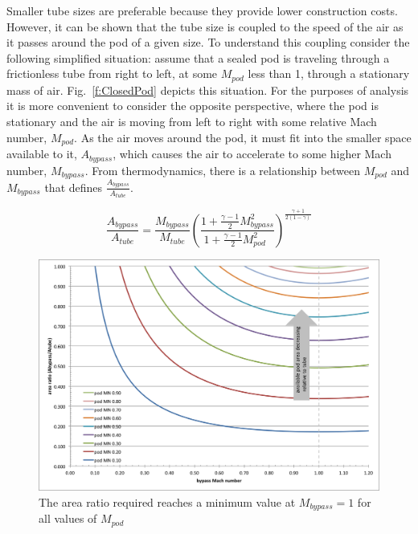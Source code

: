 \documentclass[heading.tex]{subfiles}
\begin{document}
Smaller tube sizes are preferable because they provide lower construction costs. However, it can be shown that 
the tube size is coupled to the speed of the air as it passes around the pod of a given size. 
To understand this coupling consider the following simplified situation: assume that a sealed pod
is traveling through a frictionless tube from right to left, at some $M_{pod}$ less than 1, through a stationary mass of air. 
Fig.~\ref{f:ClosedPod} depicts this situation. For the purposes of analysis it is more convenient to consider the opposite perspective, 
where the pod is stationary and the air is moving from left to right with some relative Mach number, $M_{pod}$. 
As the air moves around the pod, it must fit into the smaller space available to it, $A_{bypass}$, which causes the air 
to accelerate to some higher Mach number, $M_{bypass}$. From thermodynamics, there is a relationship between 
$M_{pod}$ and $M_{bypass}$ that defines $\frac{A_{bypass}}{A_{tube}}$.

\begin{equation}
\frac{A_{bypass}}{A_{tube}} = \frac{M_{bypass}}{M_{tube}}
\left(\frac{1+ \frac{\gamma-1}{2} M_{bypass}^2}
{1+ \frac{\gamma-1}{2} M_{pod\ \ \ }^2}\right)^{\frac{\gamma+1}{2\left(1-\gamma\right)}}
\label{e:a-over-astar}
\end{equation}

\begin{figure}[!htb]
  \centering
  \includegraphics[width=.9\textwidth]{images/choked-flow}
  \caption{The area ratio required reaches a minimum value at $M_{bypass}=1$ for all values of $M_{pod}$}
  \label{f:choked-flow}
\end{figure}
\end{document}
